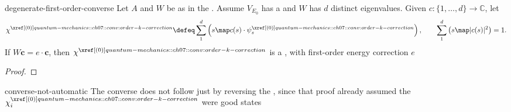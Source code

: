 \documentclass[12pt]{article}
\begin{document}
\begin{thm}{degenerate-first-order-converse}
  Let $A$ and $W$ be as in the . Assume $V_{E_0}$ has a  and $W$ has $d$ distinct eigenvalues. Given $c : \{1,\ldots,d\}\to\mathbb C$, let
  \[
    \chi^{\porder{0}}\defeq\sum_1^d\left(s\map c(s)\cdot\psi_s^{\porder{0}}\right),
    \qquad \sum_1^d\left(s\map\lvert c(s)\rvert^2\right)=1.
  \]
  If $W\mathbf c=e\cdot\mathbf c$, then $\chi^{\porder{0}}$ is a , with first-order energy correction $e$
\end{thm}

\begin{proof}
  \todo 
\end{proof}

\begin{rem}{converse-not-automatic}
  The converse does not follow just by reversing the , since that proof already assumed the $\chi_i^{\porder{0}}$ were good states
\end{rem}
\end{document}
